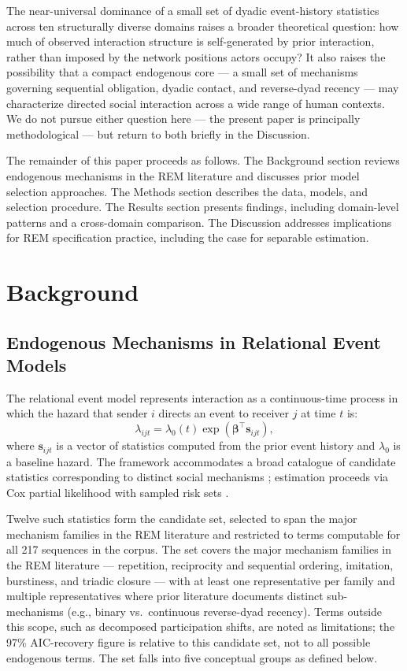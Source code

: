 \documentclass[11pt]{article}
\begin{document}
The near-universal dominance of a small set of dyadic event-history statistics
across ten structurally diverse domains raises a broader theoretical
question: how much of observed interaction structure is self-generated by
prior interaction, rather than imposed by the network positions actors occupy?
It also raises the possibility that a compact endogenous core --- a small
set of mechanisms governing sequential obligation, dyadic contact, and
reverse-dyad recency --- may characterize directed social interaction across
a wide range of human contexts. We do not pursue either question here --- the
present paper is principally methodological --- but return to both briefly in
the Discussion.

The remainder of this paper proceeds as follows. The Background section reviews
endogenous mechanisms in the REM literature and discusses prior model
selection approaches. The Methods section describes the data, models, and
selection procedure. The Results section presents findings, including
domain-level patterns and a cross-domain comparison. The Discussion addresses
implications for REM specification practice, including the case for separable
estimation.

\section{Background}

\subsection{Endogenous Mechanisms in Relational Event Models}

The relational event model \citep{butts_sm_2008} represents interaction as
a continuous-time process in which the hazard that sender $i$ directs an
event to receiver $j$ at time $t$ is:
\[
  \lambda_{ijt} = \lambda_0(t)\exp\!\left(\boldsymbol{\beta}^\top
  \mathbf{s}_{ijt}\right),
\]
where $\mathbf{s}_{ijt}$ is a vector of statistics computed from the prior
event history and $\lambda_0$ is a baseline hazard. The framework
accommodates a broad catalogue of candidate statistics corresponding to
distinct social mechanisms \citep{butts2023relational}; estimation proceeds
via Cox partial likelihood with sampled risk sets
\citep{lerner2020reliability}.

Twelve such statistics form the candidate set, selected to span the major
mechanism families in the REM literature \citep{butts2023relational} and
restricted to terms computable for all 217 sequences in the corpus. The set
covers the major mechanism families in the REM literature --- repetition,
reciprocity and sequential ordering, imitation, burstiness, and triadic closure
--- with at least one representative per family and multiple representatives
where prior literature documents distinct sub-mechanisms (e.g., binary
vs.\ continuous reverse-dyad recency).
Terms outside this scope, such as decomposed
participation shifts, are noted as limitations; the 97\% AIC-recovery figure is
relative to this candidate set, not to all possible endogenous terms. The set
falls into five conceptual groups as defined below.
\end{document}
